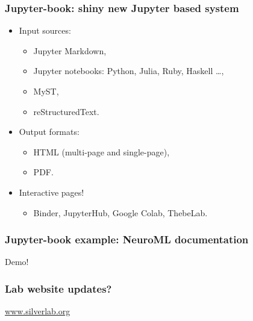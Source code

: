 \begin{frame}[c]
  \frametitle{Jupyter-book: shiny new Jupyter based system}
  \begin{itemize}
    \item Input sources:
      \begin{itemize}
        \item Jupyter Markdown,
        \item Jupyter notebooks: Python, Julia, Ruby, Haskell \ldots{},
        \item MyST,
        \item reStructuredText.
      \end{itemize}
    \item Output formats:
      \begin{itemize}
        \item HTML (multi-page and single-page),
        \item PDF\@.
      \end{itemize}
    \item \alert{Interactive pages!}
      \begin{itemize}
        \item Binder, JupyterHub, Google Colab, ThebeLab\footnotemark[6]{}.
      \end{itemize}
  \end{itemize}
\end{frame}
\begin{frame}[c]
  \frametitle{Jupyter-book example: NeuroML documentation}
  Demo!
\end{frame}
\begin{frame}[c]
  \frametitle{Lab website updates?}
  \href{www.silverlab.org}{www.silverlab.org}
\end{frame}

